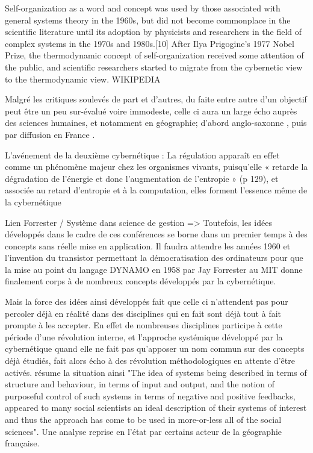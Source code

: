 {Self-organization as a word and concept was used by those associated with general systems theory in the 1960s, but did not become commonplace in the scientific literature until its adoption by physicists and researchers in the field of complex systems in the 1970s and 1980s.[10] After Ilya Prigogine's 1977 Nobel Prize, the thermodynamic concept of self-organization received some attention of the public, and scientific researchers started to migrate from the cybernetic view to the thermodynamic view. WIKIPEDIA


Malgré les critiques soulevés de part et d'autres, du faite entre autre d'un objectif peut être un peu sur-évalué voire immodeste, celle ci aura un large écho auprès des sciences humaines, et notamment en géographie; d'abord anglo-saxonne \autocite{Haggett1965, Chorley1962}, puis par diffusion en France \autocite{Raymond}.



L'avénement de la deuxième cybernétique : 
La régulation apparaît en effet comme un phénomène majeur chez les organismes vivants, puisqu’elle « retarde la dégradation de l’énergie et donc l’augmentation de l’entropie » (p 129), et associée au retard d’entropie et à la computation, elles forment l’essence même de la cybernétique



Lien Forrester / Système dans science de gestion => Toutefois, les idées développés dans le cadre de ces conférences se borne dans un premier temps à des concepts sans réelle mise en application. Il faudra attendre les années 1960 et l'invention du transistor permettant la démocratisation des ordinateurs pour que la mise au point du langage DYNAMO en 1958 par Jay Forrester au MIT donne finalement corps à de nombreux concepts développés par la cybernétique.

 Mais la force des idées ainsi développés fait que celle ci n'attendent pas pour percoler déjà en réalité dans des disciplines qui en fait sont déjà tout à fait prompte à les accepter. En effet de nombreuses disciplines participe à cette période d'une révolution interne, et l'approche systémique développé par la cybernétique quand elle ne fait pas qu'apposer un nom commun sur des concepts déjà étudiés, fait alors écho à des révolution méthodologiques en attente d'être activés. \autocite[5]{Batty1976} résume la situation ainsi "The idea of systems being described in terms of structure and behaviour, in terms of input and output, and the notion of purposeful control of such systems in terms of negative and positive feedbacks, appeared to many social scientists an ideal description of their systems of interest and thus the approach has come to be used in more-or-less all of the social sciences". 
Une analyse reprise en l'état par certains acteur de la géographie française.

}
